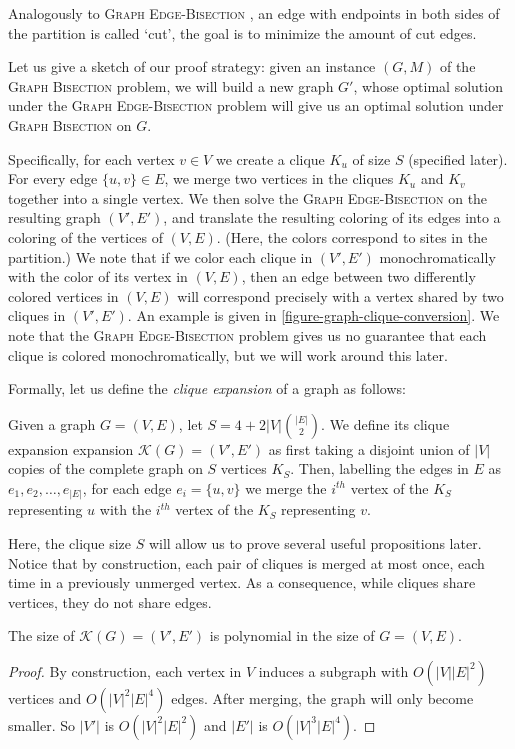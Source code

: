 \documentclass{article}
\newcommand{\gb}{\textsc{Graph \allowbreak Bisection} }
\newcommand{\geb}{\textsc{Graph \allowbreak Edge-\allowbreak Bisection} }
\begin{document}
	Analogously to \geb, an edge with endpoints in both sides of the
	partition is called `cut', the goal is to minimize the amount of
	cut edges.

	Let us give a sketch of our proof strategy:
	given an instance $(G, M)$ of the \gb problem, we
	will build a new graph $G'$, whose optimal solution under the 
	\geb problem will give us an optimal solution under \gb on $G$.

	Specifically, for each vertex $v \in V$ we create a clique $K_u$ of size
	$S$ (specified later). For every edge $\{u, v\} \in E$, we merge
	two vertices in the cliques $K_u$ and $K_v$ together into a single
	vertex. We then solve the \geb on the resulting graph $(V', E')$, and
	translate the resulting coloring of its edges into a coloring of the
	vertices of $(V, E)$. (Here, the colors correspond to sites in the
	partition.) We note that if we color each clique in $(V', E')$
	monochromatically with the color of its vertex in $(V, E)$, then
	an edge between two differently colored vertices in $(V, E)$ will
	correspond precisely with a vertex shared by two cliques in $(V', E')$.
	An example is given in \ref{figure-graph-clique-conversion}. We note that
	the \geb problem gives us no guarantee that each clique is colored
	monochromatically, but we will work around this later.

	Formally, let us define the \textit{clique expansion} of a graph as follows:

	\begin{definition}
		\label{clique-expansion}
		Given a graph $G = (V, E)$,
		let $S = 4 + 2|V|\binom{|E|}{2}$.
		We define its clique expansion expansion
		$\mathcal{K}(G) = (V', E')$ as first taking a disjoint union of $|V|$
		copies of the complete graph on $S$ vertices $K_S$. Then, labelling the
		edges in $E$ as $e_1, e_2, \dots, e_{|E|}$, for each edge $e_i = \{u, v\}$
		we merge the $i^{th}$ vertex of the $K_S$ representing $u$ with the $i^{th}$
		vertex of the $K_S$ representing $v$.
	\end{definition}

	Here, the clique size $S$ will allow us to prove several
	useful propositions later. Notice that by construction, each pair of cliques is
	merged at most once, each time in a previously unmerged vertex. As a consequence,
	while cliques share vertices, they do not share edges.

	\begin{proposition}
		\label{poly-size}
		The size of $\mathcal{K}(G) = (V', E')$ is polynomial in the size of
		$G = (V, E)$.
	\end{proposition}
	\begin{proof}
		By construction, each vertex in $V$ induces a subgraph with $O(|V||E|^2)$
		vertices and $O(|V|^2|E|^4)$ edges. After merging, the graph will only
		become smaller. So $|V'|$ is $O(|V|^2 |E|^2)$ and $|E'|$ is $O(|V|^3|E|^4)$.
	\end{proof}
\end{document}
